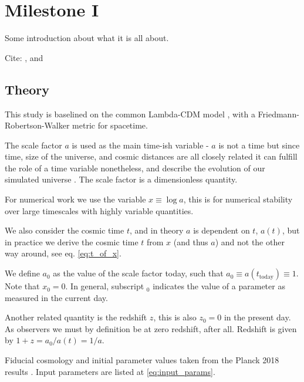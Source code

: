 \section{Milestone I}\label{sec:milestone_1}
Some introduction about what it is all about.

Cite: \citet{baumannLectureNotesCosmology2017}, \citet{dodelsonModernCosmology2003} and \citep{callinHowCalculateCMB2006, wintherCosmologyIILecture2024, huCompleteTreatmentCMB1998}

\subsection{Theory}
This study is baselined on the common Lambda-CDM model \citep[chap. 1][sec. 1.6]{dodelsonModernCosmology2021}, with a {Friedmann}-{Robertson}-{Walker} metric for spacetime.

The scale factor $a$ is used as the main time-ish variable - $a$ is not a time but since time, size of the universe, and cosmic distances are all closely related it can fulfill the role of a time variable nonetheless, and describe the evolution of our simulated universe \citep{wintherCosmologyIILecture2024}. The scale factor is a dimensionless quantity.

For numerical work we use the variable $x \equiv \log a$, this is for numerical stability over large timescales with highly variable quantities. 

We also consider the cosmic time $t$, and in theory $a$ is dependent on $t$, $a(t)$, but in practice we derive the cosmic time $t$ from $x$ (and thus $a$) and not the other way around, see eq. \ref{eq:t_of_x}.

We define $a_0$ as the value of the scale factor today, such that $a_0 \equiv a(t_{\text{today}}) \equiv 1$. Note that $x_0 = 0$. In general, subscript $_0$ indicates the value of a parameter as measured in the current day.

Another related quantity is the redshift $z$, this is also $z_0 = 0$ in the present day. As observers we must by definition be at zero redshift, after all. Redshift is given by $1+z = a_0 / a(t) = 1/a$.

\newpage
Fiducial cosmology and initial parameter values taken from the Planck 2018 results \citep{collaborationPlanck2018Results2020}. Input parameters are listed at \ref{eq:input_params}.

